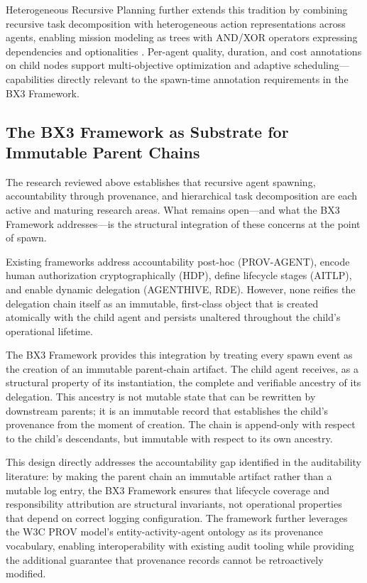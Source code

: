 Heterogeneous Recursive Planning further extends this tradition by combining recursive task decomposition with heterogeneous action representations across agents, enabling mission modeling as trees with AND/XOR operators expressing dependencies and optionalities \cite{heterogeneous-planning}. Per-agent quality, duration, and cost annotations on child nodes support multi-objective optimization and adaptive scheduling---capabilities directly relevant to the spawn-time annotation requirements in the BX3 Framework.

\subsection{The BX3 Framework as Substrate for Immutable Parent Chains}

The research reviewed above establishes that recursive agent spawning, accountability through provenance, and hierarchical task decomposition are each active and maturing research areas. What remains open---and what the BX3 Framework addresses---is the structural integration of these concerns at the point of spawn.

Existing frameworks address accountability post-hoc (PROV-AGENT), encode human authorization cryptographically (HDP), define lifecycle stages (AITLP), and enable dynamic delegation (AGENTHIVE, RDE). However, none reifies the delegation chain itself as an immutable, first-class object that is created atomically with the child agent and persists unaltered throughout the child's operational lifetime.

The BX3 Framework provides this integration by treating every spawn event as the creation of an immutable parent-chain artifact. The child agent receives, as a structural property of its instantiation, the complete and verifiable ancestry of its delegation. This ancestry is not mutable state that can be rewritten by downstream parents; it is an immutable record that establishes the child's provenance from the moment of creation. The chain is append-only with respect to the child's descendants, but immutable with respect to its own ancestry.

This design directly addresses the accountability gap identified in the auditability literature: by making the parent chain an immutable artifact rather than a mutable log entry, the BX3 Framework ensures that lifecycle coverage and responsibility attribution are structural invariants, not operational properties that depend on correct logging configuration. The framework further leverages the W3C PROV model's entity-activity-agent ontology as its provenance vocabulary, enabling interoperability with existing audit tooling while providing the additional guarantee that provenance records cannot be retroactively modified.

